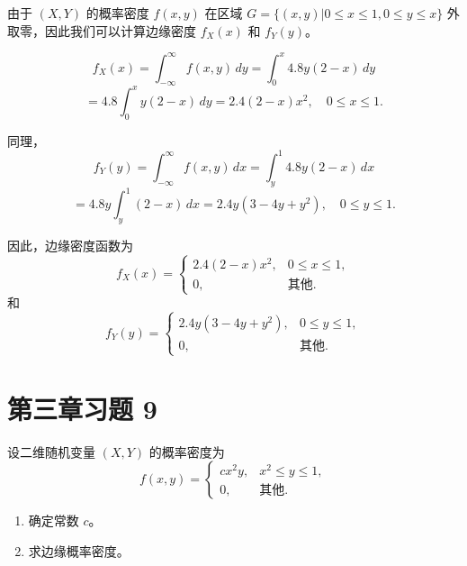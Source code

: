 \documentclass[twoside]{article}
\begin{document}
\begin{ans}{7}{7}
    由于 \( (X, Y) \) 的概率密度 \( f(x, y) \) 在区域 \( G = \{ (x, y) | 0 \leq x \leq 1, 0 \leq y \leq x \} \) 外取零，因此我们可以计算边缘密度 \( f_X(x) \) 和 \( f_Y(y) \)。

    \[
    f_X(x) = \int_{-\infty}^{\infty} f(x, y) \, dy = \int_0^x 4.8y(2 - x) \, dy
    \]
    \[
    = 4.8 \int_0^x y(2 - x) \, dy = 2.4 (2 - x) x^2, \quad 0 \leq x \leq 1.
    \]
    
    同理，
    \[
    f_Y(y) = \int_{-\infty}^{\infty} f(x, y) \, dx = \int_y^1 4.8y(2 - x) \, dx
    \]
    \[
    = 4.8y \int_y^1 (2 - x) \, dx = 2.4y(3 - 4y + y^2), \quad 0 \leq y \leq 1.
    \]
    
    因此，边缘密度函数为
    \[
    f_X(x) = 
    \begin{cases} 
    2.4 (2 - x) x^2, & 0 \leq x \leq 1, \\
    0, & \text{其他}.
    \end{cases}
    \]
    和
    \[
    f_Y(y) = 
    \begin{cases} 
    2.4y(3 - 4y + y^2), & 0 \leq y \leq 1, \\
    0, & \text{其他}.
    \end{cases}
    \]
    
\end{ans}

\section{第三章习题 9}

设二维随机变量 \( (X, Y) \) 的概率密度为
\[
f(x, y) = 
\begin{cases} 
cx^2 y, & x^2 \leq y \leq 1, \\
0, & \text{其他}.
\end{cases}
\]

\begin{enumerate}
    \item 确定常数 \( c \)。
    \item 求边缘概率密度。
\end{enumerate}
\end{document}
